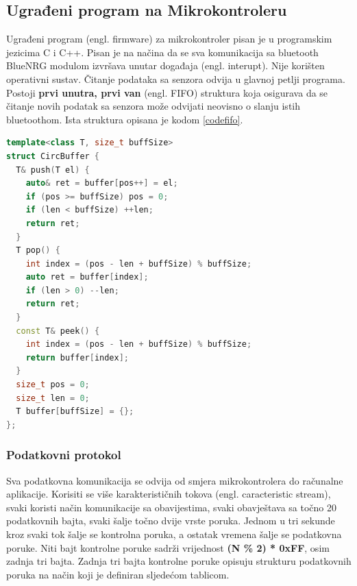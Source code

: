 \documentclass[times, utf8, diplomski]{diplomski}
\begin{document}
\subsection{Ugrađeni program na Mikrokontroleru}
Ugrađeni program (engl. firmware) za mikrokontroler pisan je u programskim jezicima C i C++. Pisan je na načina da se sva komunikacija sa bluetooth BlueNRG modulom izvršava unutar događaja (engl. interupt). Nije korišten operativni sustav. Čitanje podataka sa senzora odvija u glavnoj petlji programa. Postoji \textbf{prvi unutra, prvi van} (engl. FIFO) struktura koja osigurava da se čitanje novih podatak sa senzora može odvijati neovisno o slanju istih bluetoothom. Ista struktura opisana je kodom \ref{codefifo}.

\begin{lstlisting}[language=c++, caption={FIFO struktura koja omgučuje neovisan dohvat novih podataka i slanje najstarijih}, label={codefifo}]
template<class T, size_t buffSize>
struct CircBuffer {
  T& push(T el) {
    auto& ret = buffer[pos++] = el;
    if (pos >= buffSize) pos = 0;
    if (len < buffSize) ++len;
    return ret;
  }
  T pop() {
    int index = (pos - len + buffSize) % buffSize;
    auto ret = buffer[index];
    if (len > 0) --len;
    return ret;
  }
  const T& peek() {
    int index = (pos - len + buffSize) % buffSize;
    return buffer[index];
  }
  size_t pos = 0;
  size_t len = 0;
  T buffer[buffSize] = {};
};
\end{lstlisting}

\subsubsection{Podatkovni protokol}
Sva podatkovna komunikacija se odvija od smjera mikrokontrolera do računalne aplikacije. Korisiti se više karakterističnih tokova (engl. caracteristic stream), svaki koristi način komunikacije sa obavijestima, svaki obavještava sa točno 20 podatkovnih bajta, svaki šalje točno dvije vrste poruka. Jednom u tri sekunde kroz svaki tok šalje se kontrolna poruka, a ostatak vremena šalje se podatkovna poruke. Niti bajt kontrolne poruke sadrži vrijednost \textbf{(N \% 2) * 0xFF}, osim zadnja tri bajta. Zadnja tri bajta kontrolne poruke opisuju strukturu podatkovnih poruka na način koji je definiran sljedećom tablicom.
\end{document}
